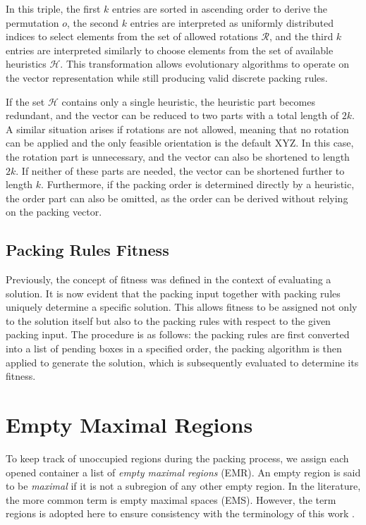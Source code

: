 In this triple, the first $k$ entries are sorted in ascending order to derive the permutation $o$, 
the second $k$ entries are interpreted as uniformly distributed indices to select elements from the set of allowed rotations $\mathcal{R}$, 
and the third $k$ entries are interpreted similarly to choose elements from the set of available heuristics $\mathcal{H}$. 
This transformation allows evolutionary algorithms to operate on the vector representation while still producing valid discrete packing rules.

If the set $\mathcal{H}$ contains only a single heuristic, the heuristic part becomes redundant, and the vector can be reduced to two parts with a total length of $2k$. 
A similar situation arises if rotations are not allowed, meaning that no rotation can be applied and the only feasible orientation is the default XYZ. 
In this case, the rotation part is unnecessary, and the vector can also be shortened to length $2k$. 
If neither of these parts are needed, the vector can be shortened further to length $k$. 
Furthermore, if the packing order is determined directly by a heuristic, the order part can also be omitted, as the order can be derived without relying on the packing vector.

\subsection{Packing Rules Fitness}
Previously, the concept of fitness was defined in the context of evaluating a solution. 
It is now evident that the packing input together with packing rules uniquely determine a specific solution. 
This allows fitness to be assigned not only to the solution itself but also to the packing rules with respect to the given packing input. 
The procedure is as follows: the packing rules are first converted into a list of pending boxes in a specified order, the packing algorithm is then applied to generate the solution, which is subsequently evaluated to determine its fitness.

\section{Empty Maximal Regions}

To keep track of unoccupied regions during the packing process, we assign each opened container a list of \emph{empty maximal regions} (EMR). 
An empty region is said to be \textit{maximal} if it is not a subregion of any other empty region. 
In the literature, the more common term is empty maximal spaces (EMS). However, the term regions is adopted here to ensure consistency with the terminology of this work \cite{lai1997, goncalves2013}.

